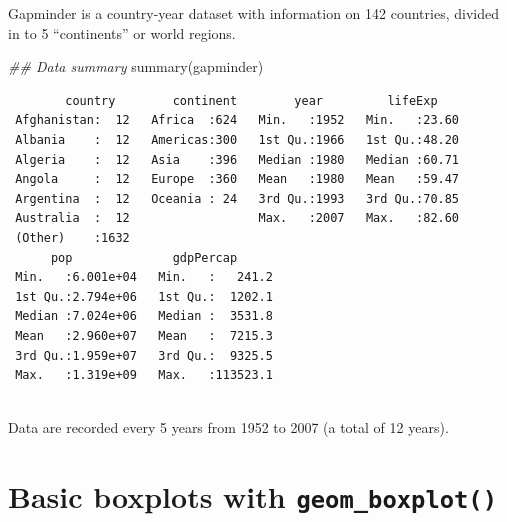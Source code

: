 \documentclass[
  letterpaper,
  DIV=11,
  numbers=noendperiod]{scrreprt}
\newenvironment{Shaded}{\begin{snugshade}}{\end{snugshade}}
\newcommand{\DocumentationTok}[1]{\textcolor[rgb]{0.37,0.37,0.37}{\textit{#1}}}
\newcommand{\FunctionTok}[1]{\textcolor[rgb]{0.28,0.35,0.67}{#1}}
\newcommand{\NormalTok}[1]{\textcolor[rgb]{0.00,0.23,0.31}{#1}}
\begin{document}
\begin{tcolorbox}[enhanced jigsaw, colframe=quarto-callout-note-color-frame, colbacktitle=quarto-callout-note-color!10!white, titlerule=0mm, opacitybacktitle=0.6, breakable, toprule=.15mm, arc=.35mm, rightrule=.15mm, colback=white, bottomrule=.15mm, opacityback=0, toptitle=1mm, left=2mm, bottomtitle=1mm, title=\textcolor{quarto-callout-note-color}{\faInfo}\hspace{0.5em}{Recap}, leftrule=.75mm, coltitle=black]

Gapminder is a country-year dataset with information on 142 countries,
divided in to 5 ``continents'' or world regions.

\begin{Shaded}
\begin{Highlighting}[]
\DocumentationTok{\#\# Data summary}
\FunctionTok{summary}\NormalTok{(gapminder)}
\end{Highlighting}
\end{Shaded}

\begin{verbatim}
        country        continent        year         lifeExp     
 Afghanistan:  12   Africa  :624   Min.   :1952   Min.   :23.60  
 Albania    :  12   Americas:300   1st Qu.:1966   1st Qu.:48.20  
 Algeria    :  12   Asia    :396   Median :1980   Median :60.71  
 Angola     :  12   Europe  :360   Mean   :1980   Mean   :59.47  
 Argentina  :  12   Oceania : 24   3rd Qu.:1993   3rd Qu.:70.85  
 Australia  :  12                  Max.   :2007   Max.   :82.60  
 (Other)    :1632                                                
      pop              gdpPercap       
 Min.   :6.001e+04   Min.   :   241.2  
 1st Qu.:2.794e+06   1st Qu.:  1202.1  
 Median :7.024e+06   Median :  3531.8  
 Mean   :2.960e+07   Mean   :  7215.3  
 3rd Qu.:1.959e+07   3rd Qu.:  9325.5  
 Max.   :1.319e+09   Max.   :113523.1  
                                       
\end{verbatim}

Data are recorded every 5 years from 1952 to 2007 (a total of 12 years).

\end{tcolorbox}

\hypertarget{basic-boxplots-with-geom_boxplot}{%
\section{\texorpdfstring{Basic boxplots with
\texttt{geom\_boxplot()}}{Basic boxplots with geom\_boxplot()}}\label{basic-boxplots-with-geom_boxplot}}
\end{document}
